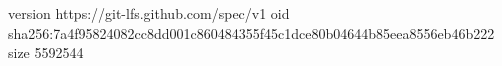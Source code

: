 version https://git-lfs.github.com/spec/v1
oid sha256:7a4f95824082cc8dd001c860484355f45c1dce80b04644b85eea8556eb46b222
size 5592544
